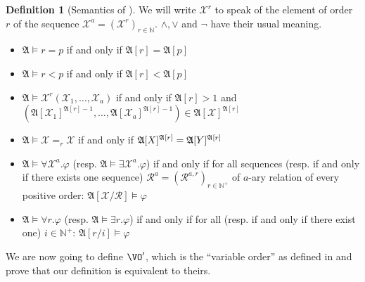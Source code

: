 \documentclass[a4paper,12pt]{article}
\theoremstyle{definition}
\newtheorem{definition}[theorem]{Definition}
\renewcommand{\phi}{\varphi}
\newcommand{\mc}{\mathcal}
\newcommand{\mf}{\mathfrak}
\begin{document}
\begin{definition}[Semantics of \VO{}]
  We will write $\mc X^{r}$ to speak of the element of order $r$ of
  the sequence $\mc X^a=(\mc X^{r})_{r\in \mathbb N}$.  $\land, \lor$
  and $ \neg$ have their usual meaning.
  \begin{itemize}
  \item $\mf A\models r=p$ if and only if $\mf A[r]=\mf A[p]$
  \item $\mf A\models r<p$ if and only if $\mf A[r]<\mf A[p]$
  \item $\mf A\models \mathcal X^{r}(\mathcal X_1,\dots,\mathcal X_a)$
    if and only if $\mf A[r]>1$ and $(\mf A[\mc X_1]^{{\mf A[r]}-1},\dots,\mf
    A[\mc X_a]^{{\mf A[r]}-1})\in\mf A[\mc X]^{{\mf A[r]}}$
  \item $\mf A\models \mc X=_r\mc X$ if and only if $\mf A[\mc \mc
    X]^{{\mf A[r]}}=\mf A[\mc \mc Y]^{{\mf A[r]}}$
  \item $\mf A\models \forall \mc X^a.\phi$ (resp.  $\mf A\models
    \exists \mc X^a.\phi$) if and only if for all sequences (resp. if
    and only if there exists one sequence) $\mathcal R^{a}=(\mc
    R^{a,r})_{r \in \mathbb N^+}$ of $a$-ary relation of every
    positive order: $\mf A[\mc X/\mc R]\models \phi$
  \item $\mf A\models \forall r.\phi$ (resp.  $\mf A\models \exists
    r.\phi$) if and only if for all (resp. if and only if there exist
    one) $i \in \mathbb N^+$: $\mf A[r/i]\models \phi$

  \end{itemize}
\end{definition}
We are now going to define $\VO'$, which is the ``variable order'' as
defined in \cite{lauri} and prove that our definition is equivalent to
theirs.
\end{document}
